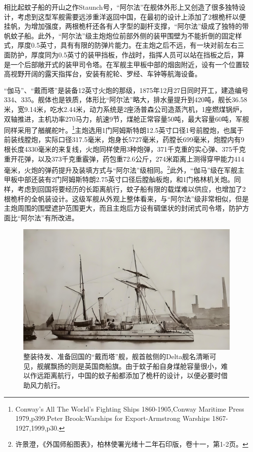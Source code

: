 \documentclass[12pt,UTF8]{ctexbook}
\begin{document}
相比起蚊子船的开山之作Staunch号，“阿尔法”在舰体外形上又创造了很多独特设计，考虑到这型军舰需要远涉重洋返回中国，在最初的设计上添加了2根桅杆以便挂帆，为增加强度，两根桅杆还各有人字型的副杆支撑，“阿尔法”级成了独特的带帆蚊子船。此外，“阿尔法”级主炮炮位前部外侧的装甲围壁为不能折倒的固定样式，厚度0.5英寸，具有有限的防弹片能力。在主炮之后不远，有一块对前左右三面防护，厚度同为0.5英寸的装甲挡板，作战时，指挥人员可以站在挡板之后，算是一个后部敞开式的装甲司令塔。在军舰主甲板中部的烟囱附近，设有一个位置较高视野开阔的露天指挥台，安装有舵轮、罗经、车钟等航海设备。

“伽马”、“戴而塔”是装备12英寸火炮的那级，1875年12月27日同时开工，建造编号334、335。舰体也是铁质，体形比“阿尔法”略大，排水量提升到420吨，舰长36.58米，宽9.14米，吃水2.44米，动力系统是2座汤普森公司造蒸汽机，1座燃煤锅炉，双轴推进，主机功率270马力，航速9节，煤舱正常容量50吨，最大容量60吨，军舰同样采用了艏艉舵叶。\footnote{Conway's All The World's Fighting Ships 1860-1905,Conway Maritime Press 1979,p399.Peter Brook:Warships for Export-Armstrong Warships 1867-1927,1999,p30.}主炮选用1门阿姆斯特朗12.5英寸口径1号前膛炮，也属于前装线膛炮，实际口径317.5毫米，炮身长5727毫米，药膛长699毫米，炮膛内有9根长度4330毫米的来复线，火炮同样使用3种炮弹，371千克重的实心弹、375千克重开花弹，以及373千克重霰弹，药包重72.6公斤，274米距离上测得穿甲能力414毫米，火炮的弹药提升及装填方式与“阿尔法”级相同。\footnote{许景澄，《外国师船图表》，柏林使署光绪十二年石印版，卷十一，第1-2页。}此外，“伽马”级在军舰主甲板中部还装有2门阿姆斯特朗2.75英寸口径后膛舢板炮，和1门格林机关炮。同样，考虑到回国将要经历的长距离航行，蚊子船有限的载煤难以供应，也增加了2根桅杆的全帆装设计。这级军舰从外观上整体看来，与“阿尔法”级非常相似，但是主炮周围的围壁遮护范围更大，而且主炮后方设有碉堡状的封闭式司令塔，防护方面比“阿尔法”有所改进。

\begin{figure}[htbp]
	\centering
	\includegraphics[width=1\linewidth]{Images/7}
	\caption{整装待发、准备回国的“戴而塔”舰，舰首舷侧的Delta舰名清晰可见，舰艉飘扬的则是英国商船旗。由于蚊子船自身煤舱容量很小，难以作远距离航行，中国的蚊子船都添加了桅杆的设计，以便必要时借助风力航行。}
	\label{fig:1}
\end{figure}
\end{document}
